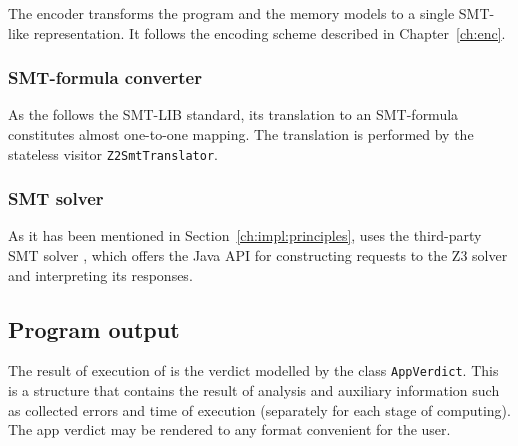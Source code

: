 The \zformula{} encoder transforms the program and the memory models to a single SMT-like representation.
It follows the encoding scheme described in Chapter~\ref{ch:enc}.

\subsubsection{SMT-formula converter}
\label{ch:impl:proc:smt-converter}

As the \zformula{} follows the SMT-LIB standard, its translation to an SMT-formula constitutes almost one-to-one mapping.
The translation is performed by the stateless visitor \texttt{Z2SmtTranslator}.


\subsubsection{SMT solver}
\label{ch:impl:proc:smt-solver}
As it has been mentioned in Section~\ref{ch:impl:principles}, \porthos[2] uses the third-party SMT solver , which offers the Java API for constructing requests to the Z3 solver and interpreting its responses.


\subsection{Program output}
\label{ch:impl:out}

The result of execution of \porthos[2] is the verdict modelled by the class \texttt{AppVerdict}.
This is a structure that contains the result of analysis and auxiliary information such as collected errors and time of execution (separately for each stage of computing).
The app verdict may be rendered to any format convenient for the user.


%
%
%
%
%
%




